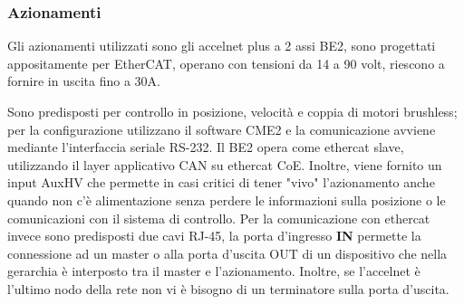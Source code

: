 \subsubsection{Azionamenti}
Gli azionamenti utilizzati sono gli accelnet plus a 2 assi BE2, sono progettati appositamente per EtherCAT, operano con tensioni da 14 a 90 volt, riescono a fornire in uscita fino a 30A.
\par Sono predisposti per controllo in posizione, velocità e coppia di motori brushless; per la configurazione utilizzano il software CME2 e la comunicazione avviene mediante l'interfaccia seriale RS-232. Il BE2 opera come ethercat slave, utilizzando il layer applicativo CAN su ethercat CoE. Inoltre, viene fornito un input AuxHV che permette in casi critici di tener "vivo" l'azionamento anche quando non c'è alimentazione senza perdere le informazioni sulla posizione o le comunicazioni con il sistema di controllo.
Per la comunicazione con ethercat invece sono predisposti due cavi RJ-45, la porta d'ingresso \textbf{IN} permette la connessione ad un master o alla porta d'uscita OUT di un dispositivo che nella gerarchia è interposto tra il master e l'azionamento. Inoltre, se l'accelnet è l'ultimo nodo della rete non vi è bisogno di un terminatore sulla porta d'uscita.
 

